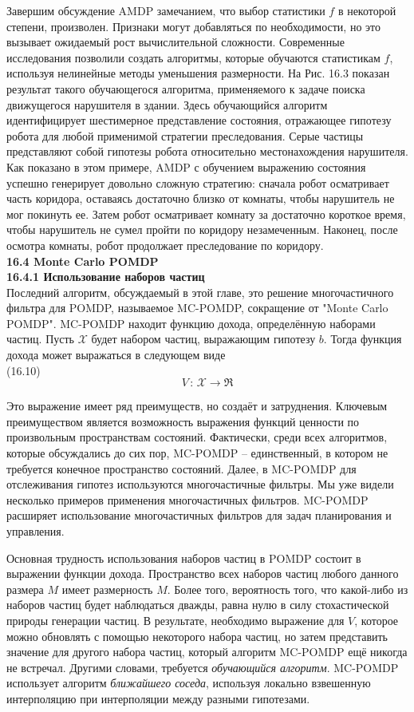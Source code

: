 \documentclass[10pt,a4paper]{article}
\begin{document}
Завершим обсуждение AMDP замечанием, что выбор статистики $f$ в некоторой степени, произволен. Признаки могут добавляться по необходимости, но это вызывает ожидаемый рост вычислительной сложности. Современные исследования позволили создать алгоритмы, которые обучаются статистикам $f$, используя нелинейные методы уменьшения размерности. На Рис. 16.3 показан результат такого обучающегося алгоритма, применяемого к задаче поиска движущегося нарушителя в здании. Здесь обучающийся алгоритм идентифицирует шестимерное представление состояния, отражающее гипотезу робота для любой применимой стратегии преследования. Серые частицы представляют собой гипотезы робота относительно местонахождения нарушителя. Как показано в этом примере, AMDP с обучением выражению состояния успешно генерирует довольно сложную стратегию: сначала робот осматривает часть коридора, оставаясь достаточно близко от комнаты, чтобы нарушитель не мог покинуть ее. Затем робот осматривает комнату за достаточно короткое время, чтобы нарушитель не сумел пройти по коридору незамеченным. Наконец, после осмотра комнаты, робот продолжает преследование по коридору.\\

\textbf{16.4	Monte Carlo POMDP}\\

\textbf{16.4.1	Использование наборов частиц}\\

Последний алгоритм, обсуждаемый в этой главе, это решение многочастичного фильтра для POMDP, называемое MC-POMDP, сокращение от "Monte Carlo POMDP". MC-POMDP находит функцию дохода, определённую наборами частиц. Пусть $\mathcal{X}$ будет набором частиц, выражающим гипотезу $b$. Тогда функция дохода может выражаться в следующем виде\\

(16.10)
$$V\,:\,\mathcal{X}\longrightarrow \Re$$

Это выражение имеет ряд преимуществ, но создаёт и затруднения. Ключевым преимуществом является возможность выражения функций ценности по произвольным пространствам состояний. Фактически, среди всех алгоритмов, которые обсуждались до сих пор, MC-POMDP – единственный, в котором не требуется конечное пространство состояний. Далее, в MC-POMDP для отслеживания гипотез используются многочастичные фильтры. Мы уже видели несколько примеров применения многочастичных фильтров. MC-POMDP расширяет использование многочастичных фильтров для задач планирования и управления.

Основная трудность использования наборов частиц в POMDP состоит в выражении функции дохода. Пространство всех наборов частиц любого данного размера $M$ имеет размерность $M$. Более того, вероятность того, что какой-либо из наборов частиц будет наблюдаться дважды, равна нулю в силу стохастической природы генерации частиц. В результате, необходимо выражение для $V$, которое можно обновлять с помощью некоторого набора частиц, но затем представить значение для другого набора частиц, который алгоритм MC-POMDP ещё никогда не встречал. Другими словами, требуется \textit{обучающийся алгоритм}. MC-POMDP использует алгоритм \textit{ближайшего соседа}, используя локально взвешенную интерполяцию при интерполяции между разными гипотезами.\\
\end{document}
